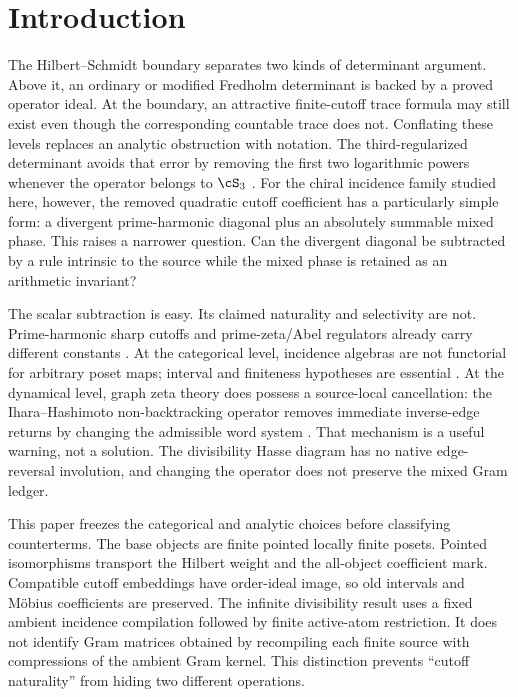 \section{Introduction}
\label{sec:introduction}

The Hilbert--Schmidt boundary separates two kinds of determinant argument.
Above it, an ordinary or modified Fredholm determinant is backed by a proved
operator ideal.  At the boundary, an attractive finite-cutoff trace formula
may still exist even though the corresponding countable trace does not.
Conflating these levels replaces an analytic obstruction with notation.
The third-regularized determinant avoids that error by removing the first two
logarithmic powers whenever the operator belongs to $\cS_3$
\citep{Simon2005,BritzEtAl2021}.  For the chiral incidence family studied
here, however, the removed quadratic cutoff coefficient has a particularly
simple form: a divergent prime-harmonic diagonal plus an absolutely summable
mixed phase.  This raises a narrower question.  Can the divergent diagonal be
subtracted by a rule intrinsic to the source while the mixed phase is retained
as an arithmetic invariant?

The scalar subtraction is easy.  Its claimed naturality and selectivity are
not.  Prime-harmonic sharp cutoffs and prime-zeta/Abel regulators already
carry different constants \citep{Mertens1874,Froberg1968}.  At the
categorical level, incidence algebras are not functorial for arbitrary poset
maps; interval and finiteness hypotheses are essential
\citep{Rota1964,ContentLemayLeroux1980,GalvezKockTonks2018}.  At the dynamical
level, graph zeta theory does possess a source-local cancellation: the
Ihara--Hashimoto non-backtracking operator removes immediate inverse-edge
returns by changing the admissible word system
\citep{Hashimoto1989,Bass1992}.  That mechanism is a useful warning, not a
solution.  The divisibility Hasse diagram has no native edge-reversal
involution, and changing the operator does not preserve the mixed Gram ledger.

This paper freezes the categorical and analytic choices before classifying
counterterms.  The base objects are finite pointed locally finite posets.
Pointed isomorphisms transport the Hilbert weight and the all-object
coefficient mark.  Compatible cutoff embeddings have order-ideal image, so
old intervals and M\"obius coefficients are preserved.  The infinite
divisibility result uses a fixed ambient incidence compilation followed by
finite active-atom restriction.  It does not identify Gram matrices obtained
by recompiling each finite source with compressions of the ambient Gram
kernel.  This distinction prevents ``cutoff naturality'' from hiding two
different operations.

